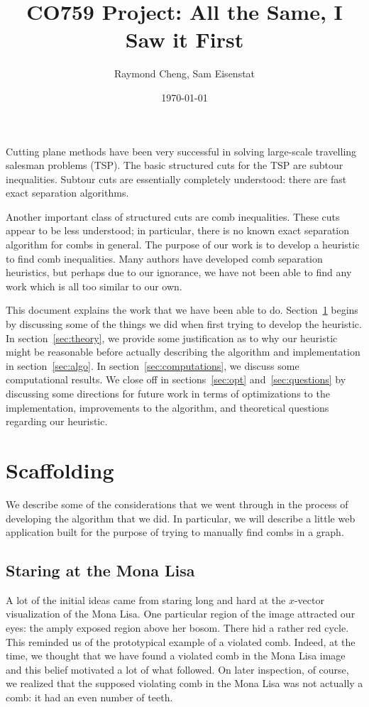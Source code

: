 \documentclass[11pt, letterpaper]{amsart}
\title{CO759 Project: All the Same, I Saw it First}
\author{Raymond Cheng, Sam Eisenstat}
\date{\today}
\theoremstyle{plain}
\theoremstyle{definition}
\theoremstyle{remark}
\begin{document}
\maketitle
Cutting plane methods have been very successful in solving large-scale
travelling salesman problems (TSP). The basic structured cuts for the TSP are
subtour inequalities. Subtour cuts are essentially completely understood: there
are fast exact separation algorithms.

Another important class of structured cuts are comb inequalities. These cuts
appear to be less understood; in particular, there is no known exact separation
algorithm for combs in general. The purpose of our work is to develop a
heuristic to find comb inequalities. Many authors have developed comb
separation heuristics, but perhaps due to our ignorance, we have not been able
to find any work which is all too similar to our own.

This document explains the work that we have been able to do.
Section~\ref{sec:scaffolding} begins by discussing some of the things we did
when first trying to develop the heuristic. In section~\ref{sec:theory}, we
provide some justification as to why our heuristic might be reasonable before
actually describing the algorithm and implementation in section~\ref{sec:algo}.
In section~\ref{sec:computations}, we discuss some computational results.  We
close off in sections~\ref{sec:opt} and~\ref{sec:questions} by discussing some
directions for future work in terms of optimizations to the implementation,
improvements to the algorithm, and theoretical questions regarding our
heuristic.

\section{Scaffolding}\label{sec:scaffolding}
We describe some of the considerations that we went through in the process of
developing the algorithm that we did. In particular, we will describe a little
web application built for the purpose of trying to manually find combs in a graph.

\subsection{Staring at the Mona Lisa}
A lot of the initial ideas came from staring long and hard at the $x$-vector
visualization of the Mona Lisa. One particular region of the image attracted
our eyes: the amply exposed region above her bosom. There hid a rather red
cycle. This reminded us of the prototypical example of a violated comb. Indeed,
at the time, we thought that we have found a violated comb in the Mona Lisa
image and this belief motivated a lot of what followed. On later inspection, of
course, we realized that the supposed violating comb in the Mona Lisa was not
actually a comb: it had an even number of teeth.
\end{document}
